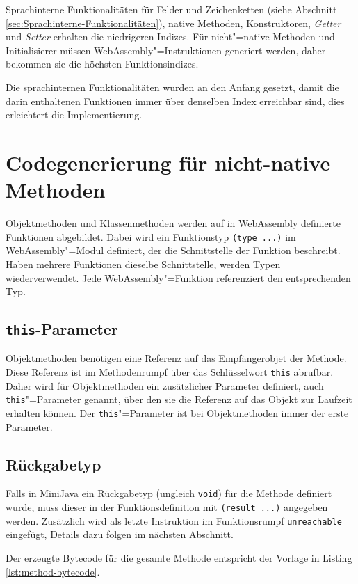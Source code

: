 \pagebreak
Sprachinterne Funktionalitäten für Felder und Zeichenketten (siehe Abschnitt \ref{sec:Sprachinterne-Funktionalitäten}), native Methoden, Konstruktoren, \emph{Getter} und \emph{Setter} erhalten die niedrigeren Indizes. Für nicht"=native Methoden und Initialisierer müssen WebAssembly"=Instruktionen generiert werden, daher bekommen sie die höchsten Funktionsindizes.


Die sprachinternen Funktionalitäten wurden an den Anfang gesetzt, damit die darin enthaltenen Funktionen immer über denselben Index erreichbar sind, dies erleichtert die Implementierung.

\section{Codegenerierung für nicht-native Methoden}

Objektmethoden und Klassenmethoden werden auf in WebAssembly definierte Funktionen abgebildet. Dabei wird ein Funktionstyp \lstinline{(type ...)} im WebAssembly"=Modul definiert, der die Schnittstelle der Funktion beschreibt. Haben mehrere Funktionen dieselbe Schnittstelle, werden Typen wiederverwendet. Jede WebAssembly"=Funktion referenziert den entsprechenden Typ.

\subsection{\lstinline{this}-Parameter}
\label{subsec:this-Parameter}
Objektmethoden benötigen eine Referenz auf das Empfängerobjet der Methode. Diese Referenz ist im Methodenrumpf über das Schlüsselwort \lstinline{this} abrufbar. Daher wird für Objektmethoden ein zusätzlicher Parameter definiert, auch \lstinline{this}"=Parameter genannt, über den sie die Referenz auf das Objekt zur Laufzeit erhalten können. Der \lstinline{this}"=Parameter ist bei Objektmethoden immer der erste Parameter.

\subsection{Rückgabetyp}
Falls in MiniJava ein Rückgabetyp (ungleich \lstinline{void}) für die Methode definiert wurde, muss dieser in der Funktionsdefinition mit \lstinline{(result ...)} angegeben werden. Zusätzlich wird als letzte Instruktion im Funktionsrumpf \lstinline{unreachable} eingefügt, Details dazu folgen im nächsten Abschnitt.

Der erzeugte Bytecode für die gesamte Methode entspricht der Vorlage in Listing \ref{lst:method-bytecode}.

